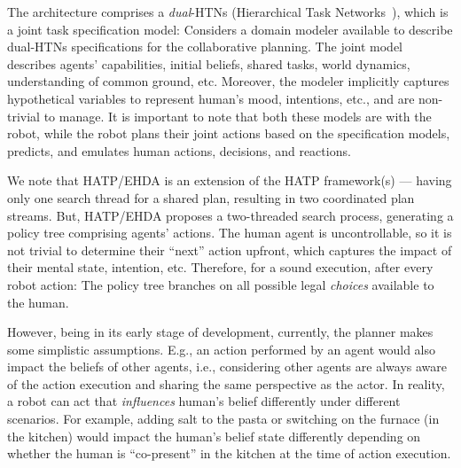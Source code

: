 \documentclass[letterpaper]{article} %
\begin{document}
The architecture comprises a \textit{dual}-HTNs (Hierarchical Task Networks~\cite{naubooks0014222}), which is a joint task specification model: 
Considers a domain modeler available to describe dual-HTNs specifications for the collaborative planning. 
The joint model describes agents'  capabilities, initial beliefs, shared tasks, world dynamics, understanding of common ground, etc. Moreover, the modeler implicitly captures hypothetical variables to represent human's mood, intentions, etc., and are non-trivial to manage. It is important to note that both these models are with the robot, while the robot plans their joint actions based on the specification models, predicts, and emulates human actions, decisions, and reactions.    

We note that HATP/EHDA is an extension of the HATP framework(s) --- having only one search thread for a shared plan, resulting in two coordinated plan streams. 
But, HATP/EHDA proposes a two-threaded search process, generating a policy tree comprising agents' actions. 
The human agent is uncontrollable, so it is not trivial to determine their ``next'' action upfront, which captures the impact of their mental state, intention,  etc.
Therefore, for a sound execution, after every robot action: The policy tree branches on all possible legal \textit{choices} available to the human.

However, being in its early stage of development, currently, the planner makes some simplistic assumptions. E.g., an action performed by an agent would also impact the beliefs of other agents, i.e., considering other agents are always aware of the action execution and sharing the same perspective as the actor. 
In reality, a robot can act that \textit{influences} human's belief differently under different scenarios. For example, adding salt to the pasta or switching on the furnace (in the kitchen) would impact the human's belief state differently depending on whether the human is ``co-present'' in the kitchen at the time of action execution.   
\end{document}
